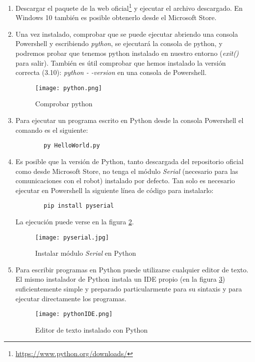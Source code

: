 \begin{enumerate}\label{list:instalacionPython}
	\item Descargar el paquete de la web oficial\footnote{\href{https://www.python.org/downloads/}{https://www.python.org/downloads/}} y ejecutar el archivo descargado. En Windows 10 también es posible obtenerlo desde el Microsoft Store.
	\item Una vez instalado, comprobar que se puede ejecutar abriendo una consola Powershell y escribiendo \textit{python}, se ejecutará la consola de python, y podremos probar que tenemos python instalado en nuestro entorno (\textit{exit()} para salir). También es útil comprobar que hemos instalado la versión correcta (3.10): \textit{python - -version} en una consola de Powershell.
	\begin{figure}[h]
		\texttt{[image: python.png]}
		\centering		
		\caption{Comprobar python}
		\label{img:python}
	\end{figure}
	\item Para ejecutar un programa escrito en Python desde la consola  Powershell el comando es el siguiente: 
	\begin{verbatim}
		py HelloWorld.py
	\end{verbatim}
	\item Es posible que la versión de Python, tanto descargada del repositorio oficial como desde Microsoft Store, no tenga el módulo \textit{Serial} (necesario para las comunicaciones con el robot) instalado por defecto. Tan solo es necesario ejecutar en Powershell la siguiente línea de código para instalarlo:
	\begin{verbatim}
		pip install pyserial
	\end{verbatim}
	La ejecución puede verse en la figura \ref{img:pyserial}.
	\begin{figure}[h]
		\texttt{[image: pyserial.jpg]}
		\centering		
		\caption{Instalar módulo \textit{Serial} en Python}
		\label{img:pyserial}
	\end{figure}
	\item Para escribir programas en Python puede utilizarse cualquier editor de texto. El mismo instalador de Python instala un IDE propio (en la figura \ref{img:pythonIDE}) suficientemente simple y preparado particularmente para su sintaxis y para ejecutar directamente los programas.
	\begin{figure}[t]
		\texttt{[image: pythonIDE.png]}
		\centering		
		\caption{Editor de texto instalado con Python}
		\label{img:pythonIDE}
	\end{figure}
\end{enumerate}
\newpage

